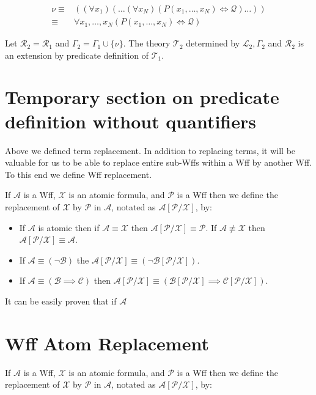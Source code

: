 \documentclass[12pt]{article}
\newcommand{\mc}[1]{\mathcal{#1}}
\begin{document}
\begin{align*}
\nu \equiv& ((\forall x_1) (\ldots (\forall x_N) (P(x_1, \ldots, x_N) \iff \mc{Q}) \ldots ))\\
\equiv& \forall x_1,\ldots,x_N (P(x_1, \ldots, x_N) \iff \mc{Q})
\end{align*}

Let $\mc{R}_2 = \mc{R}_1$ and $\Gamma_2 = \Gamma_1 \cup \{\nu\}$.
The theory $\mc{T}_2$ determined by $\mc{L}_2, \Gamma_2$ and $\mc{R}_2$ is an extension by predicate definition of $\mc{T}_1$.

\section{Temporary section on predicate definition without quantifiers}

Above we defined term replacement.
In addition to replacing terms, it will be valuable for us to be able to replace entire sub-Wffs within a Wff by another Wff.
To this end we define Wff replacement.


If $\mc{A}$ is a Wff, $\mc{X}$ is an atomic formula, and $\mc{P}$ is a Wff then we define the replacement of $\mc{X}$ by $\mc{P}$ in $\mc{A}$, notated as $\mc{A}[\mc{P}/\mc{X}]$, by:

\hrulefill
\begin{itemize}
\item{If $\mc{A}$ is atomic then if $\mc{A}\equiv \mc{X}$ then $\mc{A}[\mc{P}/\mc{X}] \equiv \mc{P}$. If $\mc{A}\not\equiv \mc{X}$ then $\mc{A}[\mc{P}/\mc{X}] \equiv \mc{A}$.}
\item{If $\mc{A} \equiv (\lnot \mc{B})$ the $\mc{A}[\mc{P}/\mc{X}] \equiv (\lnot \mc{B}[\mc{P}/\mc{X}])$.}
\item{If $\mc{A} \equiv (\mc{B} \implies \mc{C})$ then $\mc{A}[\mc{P}/\mc{X}] \equiv (\mc{B}[\mc{P}/\mc{X}] \implies \mc{C}[\mc{P}/\mc{X}])$.}
\end{itemize}
\hrulefill

It can be easily proven that if $\mc{A}$

\section{Wff Atom Replacement}

If $\mc{A}$ is a Wff, $\mc{X}$ is an atomic formula, and $\mc{P}$ is a Wff then we define the replacement of $\mc{X}$ by $\mc{P}$ in $\mc{A}$, notated as $\mc{A}[\mc{P}/\mc{X}]$, by:
\end{document}
